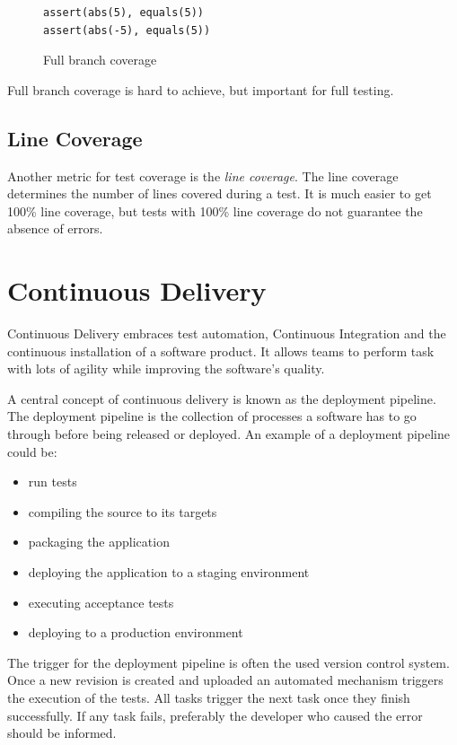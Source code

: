 \begin{figure}
\begin{lstlisting}
assert(abs(5), equals(5))
assert(abs(-5), equals(5))
\end{lstlisting}
\caption{Full branch coverage}
\label{code:fullBranch}
\end{figure}

Full branch coverage is hard to achieve, but important for full testing.

\subsection{Line Coverage}

Another metric for test coverage is the \textit{line coverage}. The line
coverage determines the number of lines covered during a test. It is much
easier to get 100\% line coverage, but tests with 100\% line coverage do
not guarantee the absence of errors.

\section{Continuous Delivery}

Continuous Delivery embraces test automation, Continuous Integration and the
continuous installation of a software product. It allows teams to perform task
with lots of agility while improving the software's quality.

A central concept of continuous delivery is known as the deployment pipeline.
The deployment pipeline is the collection of processes a software has to go
through before being released or deployed. An example of a deployment pipeline
could be: 

\begin{itemize}
  \item{run tests}
  \item{compiling the source to its targets}
  \item{packaging the application}
  \item{deploying the application to a staging environment}
  \item{executing acceptance tests}
  \item{deploying to a production environment}
\end{itemize}

The trigger for the deployment pipeline is often the used version control
system. Once a new revision is created and uploaded an automated mechanism
triggers the execution of the tests. All tasks trigger the next task once they
finish successfully. If any task fails, preferably the developer who caused the
error should be informed.


